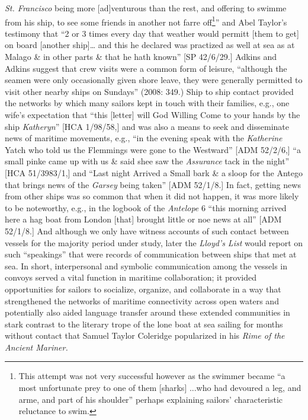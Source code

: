\textit{St. Francisco} being more [ad]venturous than the rest, and offering to swimme from his ship, to see some friends in another not farre off\footnote{This attempt was not very successful however as the swimmer became “a most unfortunate prey to one of them [sharks] ...who had devoured a leg, and arme, and part of his shoulder” \citep[21]{Gage1648} perhaps explaining sailors’ characteristic reluctance to swim.}” \citep[21,]{Gage1648} and Abel Taylor’s testimony that “2 or 3 times every day that weather would permitt [them to get] on board [another ship]… and this he declared was practized as well at sea as at Malago \& in other parts \& that he hath known” [SP 42/6/29.] Adkins and Adkins suggest that crew visits were a common form of leisure, “although the seamen were only occasionally given shore leave, they were generally permitted to visit other nearby ships on Sundays” (2008: 349.) Ship to ship contact provided the networks by which many sailors kept in touch with their families, e.g., one wife’s expectation that “this [letter] will God Willing Come to your hands by the ship \textit{Katheryn}” [HCA 1/98/58,] and was also a means to seek and disseminate news of maritime movements, e.g., “in the evening speak with the \textit{Katherine} Yatch who told us the Flemmings were gone to the Westward” [ADM 52/2/6,] “a small pinke came up with us \& said shee saw the \textit{Assurance} tack in the night” [HCA 51/3983/1,] and “Last night Arrived a Small bark \& a sloop for the Antego that brings news of the \textit{Garsey} being taken” [ADM 52/1/8.] In fact, getting news from other ships was so common that when it did not happen, it was more likely to be noteworthy, e.g., in the logbook of the \textit{Antelope} 6 \citealt{March1691} “this morning arrived here a hag boat from London [that] brought little or noe news at all” [ADM 52/1/8.] And although we only have witness accounts of such contact between vessels for the majority period under study, later the \textit{Lloyd's List} would report on such “speakings” that were records of communication between ships that met at sea. In short, interpersonal and symbolic communication among the vessels in convoys served a vital function in maritime collaboration; it provided opportunities for sailors to socialize, organize, and collaborate in a way that strengthened the networks of maritime connectivity across open waters and potentially also aided language transfer around these extended communities in stark contrast to the literary trope of the lone boat at sea sailing for months without contact that Samuel Taylor Coleridge popularized in his  \textit{Rime of the \MakeUppercase{A}}\textit{ncient Mariner.} 

